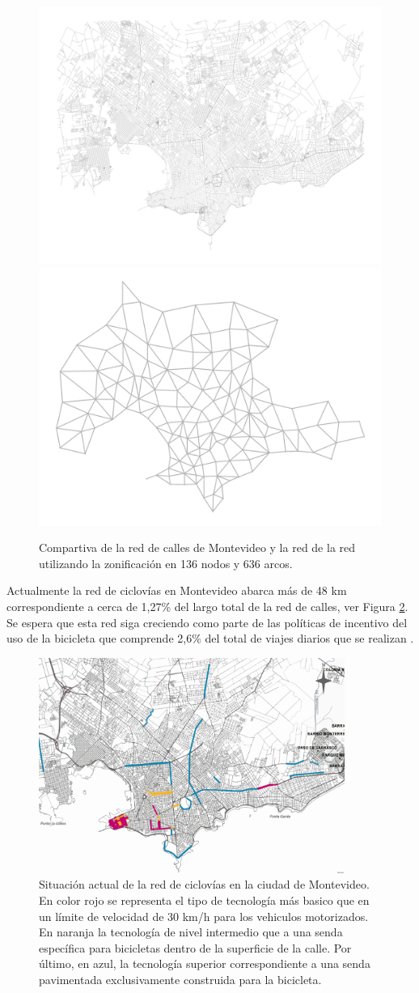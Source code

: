 \begin{figure}[h!]
  \centering
  \includegraphics[width=.49\linewidth]{../resources/montevideo_full.png}
  \includegraphics[width=.49\linewidth]{../resources/montevideo_simple.png}
  \caption{Compartiva de la red de calles de Montevideo y la red de la red utilizando la zonificación en 136 nodos y 636 arcos.}
  \label{fig:montevideosimplification}
\end{figure}

Actualmente la red de ciclovías en Montevideo abarca más de 48 km correspondiente a cerca de 1,27\% del largo total de la red de calles, ver Figura \ref{fig:montevideobikeways}. Se espera que esta red siga creciendo como parte de las políticas de incentivo del uso de la bicicleta que comprende 2,6\% del total de viajes diarios que se realizan \parencite{Mauttone2017a}.

\begin{figure}[h!]
  \centering
  \includegraphics[width=10cm]{../resources/bicicircuitos_montevideo.png}
  \caption{Situación actual de la red de ciclovías en la ciudad de Montevideo. En color rojo se representa el tipo de tecnología más basico que en un límite de velocidad de 30 km/h para los vehiculos motorizados. En naranja la tecnología de nivel intermedio que a una senda específica para bicicletas dentro de la superficie de la calle. Por último, en azul, la tecnología superior correspondiente a una senda pavimentada exclusivamente construida para la bicicleta.}
  \label{fig:montevideobikeways}
\end{figure}

